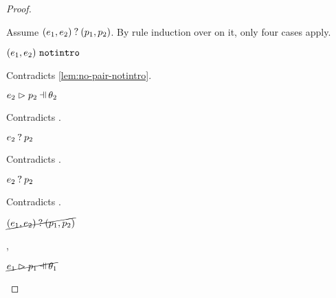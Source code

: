 \begin{proof}
\begin{byCases}
\begin{byCases}
\begin{byCases}
            Assume $(e_1 , e_2) \mathbin{?} (p_1 , p_2)$. By rule induction over  on it, only four cases apply.
            \begin{byCases}
            \item[\text{(\ref{rule:MMNotIntro})}]
                \begin{pfsteps*}
                \item $(e_1 , e_2) ~\mathtt{notintro}$ 
                \end{pfsteps*}
                Contradicts \autoref{lem:no-pair-notintro}.
            \item[\text{(\ref{rule:MMPairL})}]
                \begin{pfsteps*}
                \item $\hpatmatch{e_2}{p_2}{\theta_2}$ 
                \end{pfsteps*}
                Contradicts .
            \item[\text{(\ref{rule:MMPairR})}]
                \begin{pfsteps*}
                \item $e_2 \mathbin{?} p_2$ 
                \end{pfsteps*}
                Contradicts .
            \item[\text{(\ref{rule:MMPair})}]
                \begin{pfsteps*}
                \item $e_2 \mathbin{?} p_2$ 
                \end{pfsteps*}
                Contradicts .
            \end{byCases}
            \begin{pfsteps*}
            \item $\cancel{(e_1 , e_2) \mathbin{?} (p_1 , p_2)}$ 
            \end{pfsteps*}
        \item[\hnotmatch{e_1}{p_1},\hpatmatch{e_2}{p_2}{\theta_2}]
            \begin{pfsteps*}
            \item $\cancel{\hpatmatch{e_1}{p_1}{\theta_1}}$  

\end{pfsteps*}
\end{byCases}
\end{byCases}
\end{byCases}
\end{proof}
